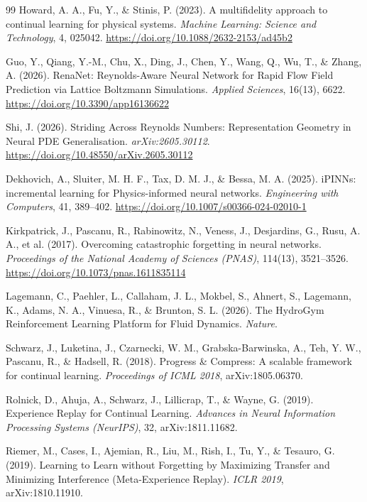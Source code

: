 \documentclass[11pt,a4paper]{article}
\begin{document}
\begin{thebibliography}{99}
Howard, A. A., Fu, Y., \& Stinis, P. (2023). A multifidelity approach to continual learning for physical systems. \textit{Machine Learning: Science and Technology}, 4, 025042. \url{https://doi.org/10.1088/2632-2153/ad45b2}

Guo, Y., Qiang, Y.-M., Chu, X., Ding, J., Chen, Y., Wang, Q., Wu, T., \& Zhang, A. (2026). RenaNet: Reynolds-Aware Neural Network for Rapid Flow Field Prediction via Lattice Boltzmann Simulations. \textit{Applied Sciences}, 16(13), 6622. \url{https://doi.org/10.3390/app16136622}

Shi, J. (2026). Striding Across Reynolds Numbers: Representation Geometry in Neural PDE Generalisation. \textit{arXiv:2605.30112}. \url{https://doi.org/10.48550/arXiv.2605.30112}

Dekhovich, A., Sluiter, M. H. F., Tax, D. M. J., \& Bessa, M. A. (2025). iPINNs: incremental learning for Physics-informed neural networks. \textit{Engineering with Computers}, 41, 389--402. \url{https://doi.org/10.1007/s00366-024-02010-1}

Kirkpatrick, J., Pascanu, R., Rabinowitz, N., Veness, J., Desjardins, G., Rusu, A. A., et al. (2017). Overcoming catastrophic forgetting in neural networks. \textit{Proceedings of the National Academy of Sciences (PNAS)}, 114(13), 3521--3526. \url{https://doi.org/10.1073/pnas.1611835114}

Lagemann, C., Paehler, L., Callaham, J. L., Mokbel, S., Ahnert, S., Lagemann, K., Adams, N. A., Vinuesa, R., \& Brunton, S. L. (2026). The HydroGym Reinforcement Learning Platform for Fluid Dynamics. \textit{Nature}.

Schwarz, J., Luketina, J., Czarnecki, W. M., Grabska-Barwinska, A., Teh, Y. W., Pascanu, R., \& Hadsell, R. (2018). Progress \& Compress: A scalable framework for continual learning. \textit{Proceedings of ICML 2018}, arXiv:1805.06370.

Rolnick, D., Ahuja, A., Schwarz, J., Lillicrap, T., \& Wayne, G. (2019). Experience Replay for Continual Learning. \textit{Advances in Neural Information Processing Systems (NeurIPS)}, 32, arXiv:1811.11682.

Riemer, M., Cases, I., Ajemian, R., Liu, M., Rish, I., Tu, Y., \& Tesauro, G. (2019). Learning to Learn without Forgetting by Maximizing Transfer and Minimizing Interference (Meta-Experience Replay). \textit{ICLR 2019}, arXiv:1810.11910.


\end{thebibliography}
\end{document}
